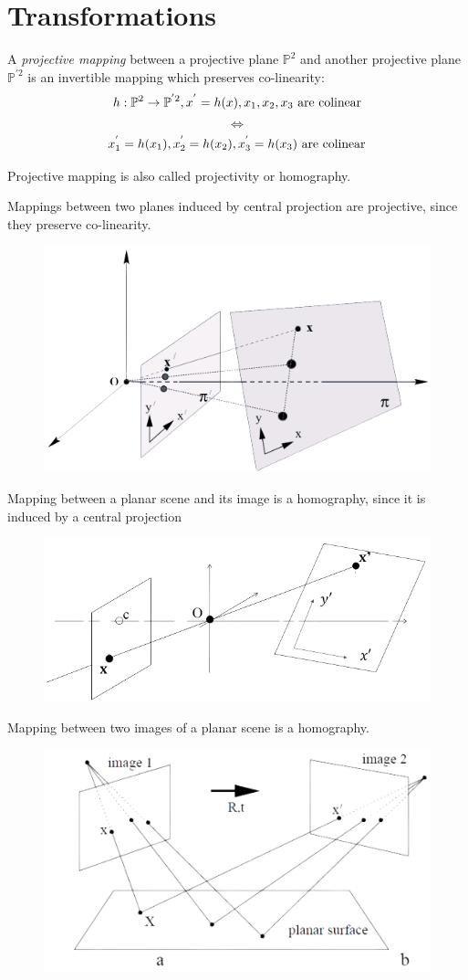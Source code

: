 \documentclass[12pt, a4paper]{report}
\begin{document}
\newpage

\section{Transformations}
    \begin{definition}
        A \emph{projective mapping} between a projective plane $\mathbb{P}^2$ and another projective plane $\mathbb{P}^{'2}$ is an invertible mapping which preserves co-linearity:
        \[h:\mathbb{P}^2 \rightarrow \mathbb{P}^{'2}, x^{'}=h(x),x_1,x_2,x_3 \textnormal{ are colinear}\]
        \[\Leftrightarrow\]
        \[x_1^{'}=h(x_1),x_2^{'}=h(x_2),x_3^{'}=h(x_3) \textnormal{ are colinear}\]
    \end{definition}
    Projective mapping is also called projectivity or homography. 
    \begin{example}
        Mappings between two planes induced by central projection are projective, since they preserve co-linearity. 
        \begin{figure}[H]
            \centering
            \includegraphics[width=0.4\linewidth]{images/map1.png}
        \end{figure}
        Mapping between a planar scene and its image is a homography, since it is induced by a central projection
        \begin{figure}[H]
            \centering
            \includegraphics[width=0.4\linewidth]{images/map2.png}
        \end{figure}
        Mapping between two images of a planar scene is a homography.
        \begin{figure}[H]
            \centering
            \includegraphics[width=0.4\linewidth]{images/map3.png}

\end{figure}
\end{example}
\end{document}
